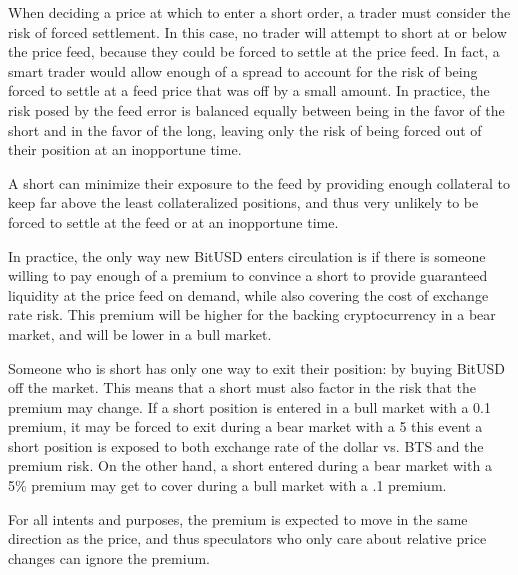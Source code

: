 When deciding a price at which to enter a short order, a trader must consider
the risk of forced settlement. In this case, no trader will attempt to short at
or below the price feed, because they could be forced to settle at the price
feed. In fact, a smart trader would allow enough of a spread to account for the
risk of being forced to settle at a feed price that was off by a small amount.
In practice, the risk posed by the feed error is balanced equally between being
in the favor of the short and in the favor of the long, leaving only the risk
of being forced out of their position at an inopportune time.

A short can minimize their exposure to the feed by providing enough collateral
to keep far above the least collateralized positions, and thus very unlikely to
be forced to settle at the feed or at an inopportune time.

In practice, the only way new BitUSD enters circulation is if there is someone
willing to pay enough of a premium to convince a short to provide guaranteed
liquidity at the price feed on demand, while also covering the cost of exchange
rate risk. This premium will be higher for the backing cryptocurrency in a bear
market, and will be lower in a bull market.

Someone who is short has only one way to exit their position: by buying BitUSD
off the market. This means that a short must also factor in the risk that the
premium may change. If a short position is entered in a bull market with a 0.1%
premium, it may be forced to exit during a bear market with a 5%
this event a short position is exposed to both exchange rate of the dollar vs.
BTS and the premium risk. On the other hand, a short entered during a bear
market with a 5\% premium may get to cover during a bull market with a .1%
premium.

For all intents and purposes, the premium is expected to move in the same
direction as the price, and thus speculators who only care about relative price
changes can ignore the premium.
